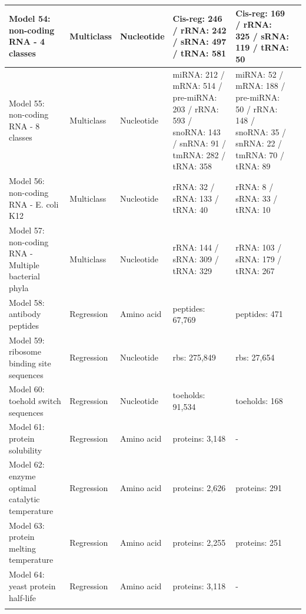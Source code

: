 \begin{longtable}{
  *{6}{>{\raggedright\arraybackslash}p{3cm}}
}
\midrule
Model 54: non-coding RNA - 4 classes & Multiclass & Nucleotide & Cis-reg: 246 / rRNA: 242 / sRNA: 497 / tRNA: 581 & Cis-reg: 169 / rRNA: 325 / sRNA: 119 / tRNA: 50 & \cite{avila2024biodeepfuse} \\
\midrule
Model 55: non-coding RNA - 8 classes & Multiclass & Nucleotide & miRNA: 212 / mRNA: 514 / pre-miRNA: 203 / rRNA: 593 / snoRNA: 143 / snRNA: 91 / tmRNA: 282 / tRNA: 358 & miRNA: 52 / mRNA: 188 / pre-miRNA: 50 / rRNA: 148 / snoRNA: 35 / snRNA: 22 / tmRNA: 70 / tRNA: 89 & \cite{bonidia2022bioautoml} \\
\midrule
Model 56: non-coding RNA - E. coli K12 & Multiclass & Nucleotide & rRNA: 32 / sRNA: 133 / tRNA: 40 & rRNA: 8 / sRNA: 33 / tRNA: 10 & \cite{bonidia2022bioautoml} \\
\midrule
Model 57: non-coding RNA - Multiple bacterial phyla & Multiclass & Nucleotide & rRNA: 144 / sRNA: 309 / tRNA: 329 & rRNA: 103 / sRNA: 179 / tRNA: 267 & \cite{bonidia2022bioautoml} \\
\midrule
Model 58: antibody peptides & Regression & Amino acid & peptides: 67,769 & peptides: 471 & \cite{liu2020antibody} \\
\midrule
Model 59: ribosome binding site sequences & Regression & Nucleotide & rbs: 275,849 & rbs: 27,654 & \cite{hollerer2020large} \\
\midrule
Model 60: toehold switch sequences & Regression & Nucleotide & toeholds: 91,534 & toeholds: 168 & \cite{valeri2020sequence} \\
\midrule
Model 61: protein solubility & Regression & Amino acid & proteins: 3,148 & - & \cite{han2019solubility} \\
\midrule
Model 62: enzyme optimal catalytic temperature & Regression & Amino acid & proteins: 2,626 & proteins: 291 & \cite{qiu2025seq2topt} \\
\midrule
Model 63: protein melting temperature & Regression & Amino acid & proteins: 2,255 & proteins: 251 & \cite{leuenberger2017thermal,li2022deepet} \\
\midrule
Model 64: yeast protein half-life & Regression & Amino acid & proteins: 3,118 & - & \cite{martinperez2017turnover} \\
\label{benchmark_datasets}
\end{longtable}
